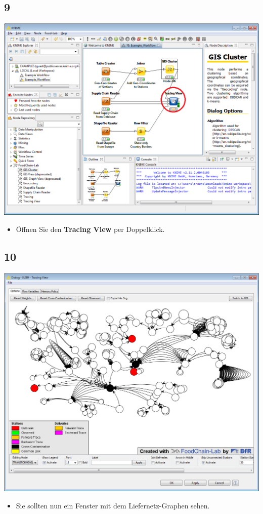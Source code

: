 \documentclass{beamer}
\begin{document}
\subsection{9}
\begin{frame}
	\begin{center}
  		\includegraphics[height=0.6\textheight]{9.png}
	\end{center}
	\begin{itemize}
		\item Öffnen Sie den \textbf{Tracing View} per Doppelklick.
	\end{itemize}
\end{frame}

\subsection{10}
\begin{frame}
	\begin{center}
  		\includegraphics[height=0.6\textheight]{10.png}
	\end{center}
	\begin{itemize}
		\item Sie sollten nun ein Fenster mit dem Liefernetz-Graphen sehen.
	\end{itemize}
\end{frame}
\end{document}
